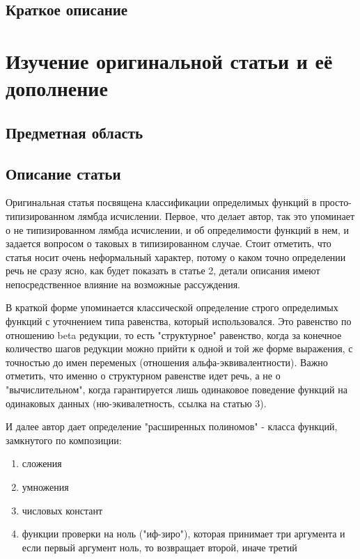 \documentclass[times,specification,annotation]{itmo-student-thesis}
\begin{document}
\section{Краткое описание}
\todo
\chapter{Изучение оригинальной статьи и её дополнение}

\todo
\section{Предметная область}
\todo
\section{Описание статьи}
    Оригинальная статья посвящена классификации определимых функций в просто-типизированном лямбда исчислении.
    Первое, что делает автор, так это упоминает о не типизированном лямбда исчислении, и об определимости функций в нем, и задается
    вопросом о таковых в типизированном случае. Стоит отметить, что статья носит
    очень неформальный характер, потому о каком точно определении речь не сразу ясно,
    как будет показать в статье 2, детали описания имеют непосредственное влияние на возможные рассуждения.

    В краткой форме упоминается классической определение строго определимых функций с 
    уточнением типа равенства, который использовался. Это равенство по отношению beta редукции, 
    то есть "структурное" равенство, когда за конечное количество шагов редукции можно прийти к одной и той же форме выражения, с точностью до имен переменых (отношения альфа-эквивалентности).
    Важно отметить, что именно о структурном равенстве идет речь, а не о "вычислительном", когда гарантируется
    лишь одинаковое поведение функций на одинаковых данных (ню-экивалетность, ссылка на статью 3).

    И далее автор дает определение "расширенных полиномов" - класса функций, замкнутого по композиции:

    \begin{enumerate}
        \item сложения
        \item умножения
        \item числовых констант
        \item функции проверки на ноль ("иф-зиро"), которая принимает три аргумента и если первый 
        аргумент ноль, то возвращает второй, иначе третий
    \end{enumerate}
\end{document}
